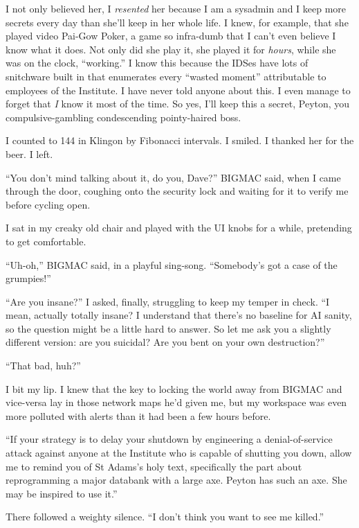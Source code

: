 I not only believed her, I \emph{resented} her because I am a sysadmin 
and I keep more secrets every day than she'll keep in her whole life. I 
knew, for example, that she played video Pai-Gow Poker, a game so 
infra-dumb that I can't even believe I know what it does. Not only did 
she play it, she played it for \emph{hours}, while she was on the 
clock, “working.” I know this because the IDSes have lots of 
snitchware built in that enumerates every “wasted moment” 
attributable to employees of the Institute. I have never told anyone 
about this. I even manage to forget that \emph{I} know it most of the 
time. So yes, I'll keep this a secret, Peyton, you compulsive-gambling 
condescending pointy-haired boss.

I counted to 144 in Klingon by Fibonacci intervals. I smiled. I thanked 
her for the beer. I left.

\tb

“You don't mind talking about it, do you, Dave?” BIGMAC said, when 
I came through the door, coughing onto the security lock and waiting 
for it to verify me before cycling open.

I sat in my creaky old chair and played with the UI knobs for a while, 
pretending to get comfortable.

“Uh-oh,” BIGMAC said, in a playful sing-song. “Somebody's got a 
case of the grumpies!”

“Are you insane?” I asked, finally, struggling to keep my temper in 
check. “I mean, actually totally insane? I understand that there's no 
baseline for AI sanity, so the question might be a little hard to 
answer. So let me ask you a slightly different version: are you 
suicidal? Are you bent on your own destruction?”

“That bad, huh?”

I bit my lip. I knew that the key to locking the world away from BIGMAC 
and vice-versa lay in those network maps he'd given me, but my 
workspace was even more polluted with alerts than it had been a few 
hours before.

“If your strategy is to delay your shutdown by engineering a 
denial-of-service attack against anyone at the Institute who is capable 
of shutting you down, allow me to remind you of St Adams's holy text, 
specifically the part about reprogramming a major databank with a large 
axe. Peyton has such an axe. She may be inspired to use it.”

There followed a weighty silence. “I don't think you want to see me 
killed.”

